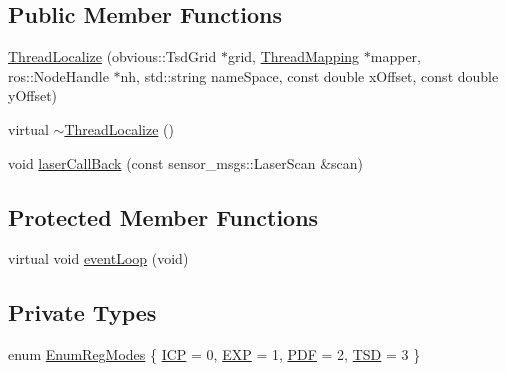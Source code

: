 \subsection*{Public Member Functions}
\begin{DoxyCompactItemize}
\item 
\hyperlink{classohm__tsd__slam__ref_1_1ThreadLocalize_a6664fba91fb551b13cf721638b55f36e}{Thread\-Localize} (obvious\-::\-Tsd\-Grid $\ast$grid, \hyperlink{classohm__tsd__slam__ref_1_1ThreadMapping}{Thread\-Mapping} $\ast$mapper, ros\-::\-Node\-Handle $\ast$nh, std\-::string name\-Space, const double x\-Offset, const double y\-Offset)
\item 
virtual \hyperlink{classohm__tsd__slam__ref_1_1ThreadLocalize_ad6d771a1b24111bff419ecfed45ee470}{$\sim$\-Thread\-Localize} ()
\item 
void \hyperlink{classohm__tsd__slam__ref_1_1ThreadLocalize_ab93dfc8a688c178b641ef5deec94bf91}{laser\-Call\-Back} (const sensor\-\_\-msgs\-::\-Laser\-Scan \&scan)
\end{DoxyCompactItemize}
\subsection*{Protected Member Functions}
\begin{DoxyCompactItemize}
\item 
virtual void \hyperlink{classohm__tsd__slam__ref_1_1ThreadLocalize_ac2ee24d1021f03eaa4abf6420bea46b4}{event\-Loop} (void)
\end{DoxyCompactItemize}
\subsection*{Private Types}
\begin{DoxyCompactItemize}
\item 
enum \hyperlink{classohm__tsd__slam__ref_1_1ThreadLocalize_ac5ed59506607265dc4c38a64cf36156f}{Enum\-Reg\-Modes} \{ \hyperlink{classohm__tsd__slam__ref_1_1ThreadLocalize_ac5ed59506607265dc4c38a64cf36156fa4c2ccd40e418593ae90c9844a7e8b27b}{I\-C\-P} = 0, 
\hyperlink{classohm__tsd__slam__ref_1_1ThreadLocalize_ac5ed59506607265dc4c38a64cf36156faa5d6bcb6b063925c8ceee9660ba6fe82}{E\-X\-P} = 1, 
\hyperlink{classohm__tsd__slam__ref_1_1ThreadLocalize_ac5ed59506607265dc4c38a64cf36156fa5fca603cf985a7804238323fc6261c45}{P\-D\-F} = 2, 
\hyperlink{classohm__tsd__slam__ref_1_1ThreadLocalize_ac5ed59506607265dc4c38a64cf36156fae6fb70bc18328170438ececea919a178}{T\-S\-D} = 3
 \}
\end{DoxyCompactItemize}
